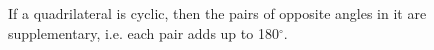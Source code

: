 If a quadrilateral is cyclic, then the pairs of opposite angles in it
are supplementary, i.e. each pair adds up to 180$^{\circ}$.